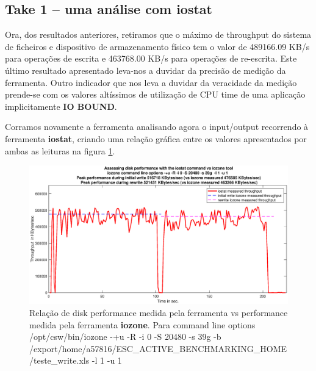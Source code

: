 \documentclass[a4paper]{article}
\begin{document}
{ \subsection{Take 1 -- uma análise com iostat}
Ora, dos resultados anteriores, retiramos que o máximo de throughput do sistema de ficheiros e dispositivo de armazenamento físico tem o valor de 489166.09 KB/s para operações de escrita e 463768.00 KB/s para operações de re-escrita. Este último resultado apresentado leva-nos a duvidar da precisão de medição da ferramenta. Outro indicador que nos leva a duvidar da veracidade da medição prende-se com os valores altíssimos de utilização de CPU time de uma aplicação implicitamente \textbf{IO BOUND}.\par 
Corramos novamente a ferramenta analisando agora o input/output recorrendo à ferramenta \textbf{iostat}, criando uma relação gráfica entre os valores apresentados por ambas as leituras na figura \ref{fig:iostat}.

\begin{figure}[H]
\centering
\includegraphics[width=1.1\columnwidth]{EPS/iostat.eps}
\caption{Relação de disk performance medida pela ferramenta  vs performance medida pela ferramenta \textbf{iozone}. Para command line options /opt/csw/bin/iozone -+u -R -i 0 -S 20480 -s 39g -b /export/home/a57816/ESC\_ACTIVE\_BENCHMARKING\_HOME/teste\_write.xls -l 1 -u 1
}
\label{fig:iostat}
\end{figure}

}
\end{document}
